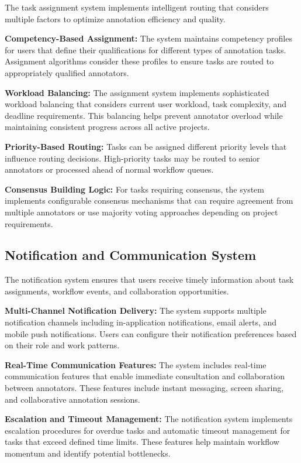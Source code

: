 The task assignment system implements intelligent routing that considers multiple factors to optimize annotation efficiency and quality.

\textbf{Competency-Based Assignment:} The system maintains competency profiles for users that define their qualifications for different types of annotation tasks. Assignment algorithms consider these profiles to ensure tasks are routed to appropriately qualified annotators.

\textbf{Workload Balancing:} The assignment system implements sophisticated workload balancing that considers current user workload, task complexity, and deadline requirements. This balancing helps prevent annotator overload while maintaining consistent progress across all active projects.

\textbf{Priority-Based Routing:} Tasks can be assigned different priority levels that influence routing decisions. High-priority tasks may be routed to senior annotators or processed ahead of normal workflow queues.

\textbf{Consensus Building Logic:} For tasks requiring consensus, the system implements configurable consensus mechanisms that can require agreement from multiple annotators or use majority voting approaches depending on project requirements.

\subsection{Notification and Communication System}

The notification system ensures that users receive timely information about task assignments, workflow events, and collaboration opportunities.

\textbf{Multi-Channel Notification Delivery:} The system supports multiple notification channels including in-application notifications, email alerts, and mobile push notifications. Users can configure their notification preferences based on their role and work patterns.

\textbf{Real-Time Communication Features:} The system includes real-time communication features that enable immediate consultation and collaboration between annotators. These features include instant messaging, screen sharing, and collaborative annotation sessions.

\textbf{Escalation and Timeout Management:} The notification system implements escalation procedures for overdue tasks and automatic timeout management for tasks that exceed defined time limits. These features help maintain workflow momentum and identify potential bottlenecks.

